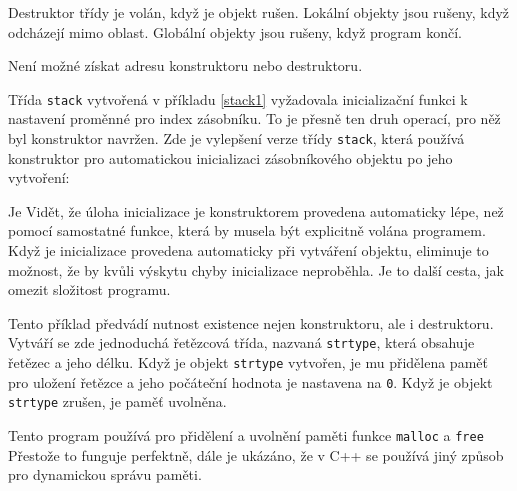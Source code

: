       Destruktor třídy je volán, když je objekt rušen. Lokální objekty jsou rušeny, když odcházejí 
      mimo oblast. Globální objekty jsou rušeny, když program končí.
  
      Není možné získat adresu konstruktoru nebo destruktoru.
      \begin{example}
        Třída \lstinline[basicstyle=\ttfamily]!stack! vytvořená v příkladu \ref{stack1} vyžadovala 
        inicializační funkci k nastavení proměnné pro index zásobníku. To je přesně ten druh 
        operací, pro něž byl konstruktor navržen. Zde je vylepšení verze třídy 
        \lstinline[basicstyle=\ttfamily]!stack!, která používá konstruktor pro automatickou 
        inicializaci zásobníkového objektu po jeho vytvoření:
        
        Je Vidět, že úloha inicializace je konstruktorem provedena automaticky lépe, než pomocí 
        samostatné funkce, která by musela být explicitně volána programem. Když je inicializace 
        provedena automaticky při vytváření objektu, eliminuje to možnost, že by kvůli výskytu 
        chyby inicializace neproběhla. Je to další cesta, jak omezit složitost programu.
      \end{example}
      \begin{example}
        Tento příklad předvádí nutnost existence nejen konstruktoru, ale i destruktoru. Vytváří se 
        zde jednoduchá řetězcová třída, nazvaná \lstinline[basicstyle=\ttfamily]!strtype!, která 
        obsahuje řetězec a jeho délku. Když je objekt \lstinline[basicstyle=\ttfamily]!strtype! 
        vytvořen, je mu přidělena paměť pro uložení řetězce a jeho počáteční hodnota je nastavena 
        na \lstinline[basicstyle=\ttfamily]!0!. Když je objekt     
        \lstinline[basicstyle=\ttfamily]!strtype! zrušen, je paměť uvolněna.
        
      \end{example}
      Tento program používá pro přidělení a uvolnění paměti funkce 
      \lstinline[basicstyle=\ttfamily]!malloc! a \lstinline[basicstyle=\ttfamily]!free! Přestože to 
      funguje perfektně, dále je ukázáno, že v C++ se používá jiný způsob pro dynamickou správu 
      paměti.   

\printbibliography[title={Seznam literatury}, heading=subbibliography]
